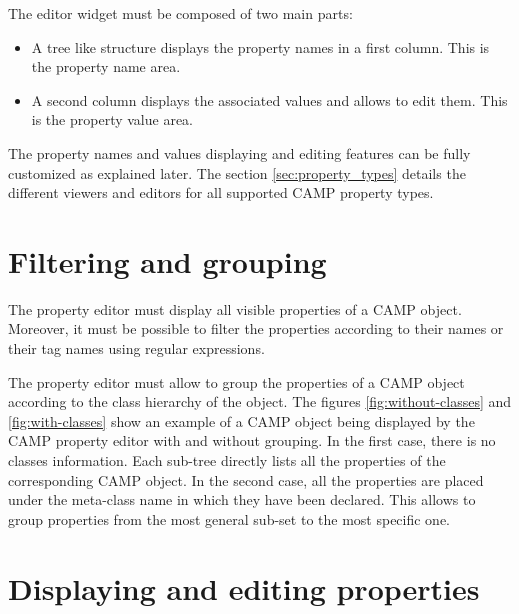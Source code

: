 \documentclass[a4paper, twoside]{report}
\begin{document}

The editor widget must be composed of two main parts:
\begin{itemize}
    \item A tree like structure displays the property names in a first column. This is the property
name area.
    \item A second column displays the associated values and allows to edit them. This is the
property value area.
\end{itemize}

The property names and values displaying and editing features can be fully customized as explained
later. The section \ref{sec:property_types} details the different viewers and editors for all supported
CAMP property types.

\section{Filtering and grouping}

The property editor must display all visible properties of a CAMP object. Moreover, it must be possible
to filter the properties according to their names or their tag names using regular expressions.

The property editor must allow to group the properties of a CAMP object according to the class
hierarchy of the object. The figures \ref{fig:without-classes} and \ref{fig:with-classes} show an
example of a CAMP object being displayed by the CAMP property editor with and without grouping. In
the first case, there is no classes information. Each sub-tree directly lists all the properties of the
corresponding CAMP object. In the second case, all the properties are placed under the meta-class
name in which they have been declared. This allows to group properties from the most general sub-set to the
most specific one.


\section{Displaying and editing properties}
\end{document}
